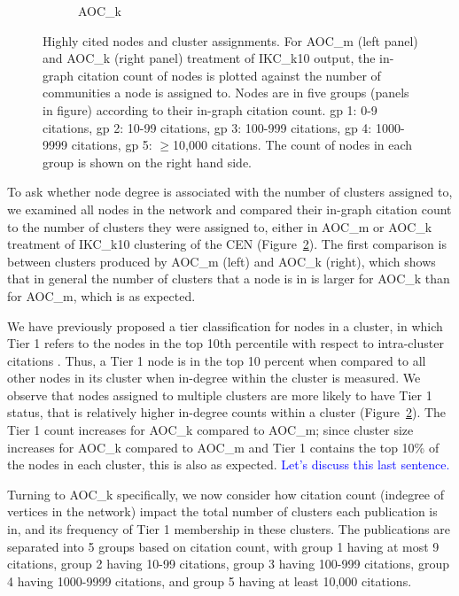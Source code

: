 \documentclass[12pt, oneside]{article}   	%
\begin{document}
\begin{figure}[H]
\begin{subfigure}[t]{0.48\textwidth}
        \caption{AOC\_k} \label{fig:2b}
    	\end{subfigure}
\captionsetup{width=0.9\textwidth}	
\caption{Highly cited nodes and cluster assignments. For AOC\_m (left panel) and AOC\_k (right panel) treatment of IKC\_k10 output, the in-graph citation count of nodes is plotted against the number of communities a node is assigned to. Nodes are in five groups (panels in figure) according to their in-graph citation count. gp 1: 0-9 citations, gp 2: 10-99 citations, gp 3: 100-999 citations, gp 4: 1000-9999 citations, gp 5: $\geq$10,000 citations. The count of nodes in each group is shown on the right hand side.}
\label{fig:fig3}

\end{figure}

To ask whether node degree is associated with the number of clusters assigned to, we examined all nodes in the network and compared their in-graph citation count to the number of clusters they were assigned to, either in AOC\_m or AOC\_k treatment of IKC\_k10 clustering of the CEN (Figure~\ref{fig:fig3}). The first comparison is between clusters produced by AOC\_m (left) and AOC\_k (right), which shows that in general the number of clusters that a node is in is larger for AOC\_k than for AOC\_m, which is as expected.

We have previously proposed a tier classification for nodes in a cluster, in which Tier 1 refers to the nodes in the top 10th percentile with respect to intra-cluster citations \citep{Chandrasekharan2021}. Thus, a Tier 1 node is in the top 10 percent when compared to all other nodes in its cluster when in-degree within the cluster is measured. We observe that nodes assigned to multiple clusters are more likely to have Tier 1 status, that is relatively higher in-degree counts within a cluster (Figure~\ref{fig:fig3}). The Tier 1 count increases for AOC\_k compared to AOC\_m; since cluster size  increases for AOC\_k compared to AOC\_m and Tier 1 contains the top 10\% of the nodes in each cluster, this is also as expected. \textcolor{blue}{Let's discuss this last sentence.}

Turning to AOC\_k specifically, we now consider how
citation count (indegree of vertices in the network) impact
the total number of clusters each publication is in, and its
frequency of Tier 1 membership in these clusters.
The publications are separated  into 5 groups based on 
citation count, with group 1 having at most 9 citations,
group 2 having 10-99 citations, group 3 having 100-999 citations,
group 4 having 1000-9999 citations, and group 5 having
at least 10,000 citations. 
\end{document}
